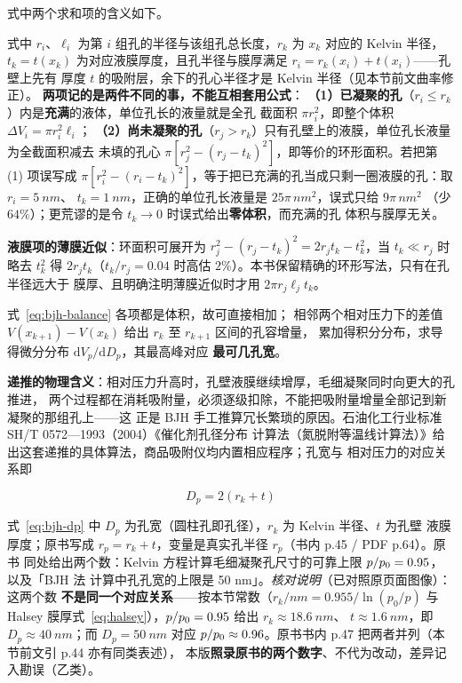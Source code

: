 式中两个求和项的含义如下。

式中 $r_i$、$\ell_i$ 为第 $i$ 组孔的半径与该组孔总长度，$r_k$ 为 $x_k$ 对应的 Kelvin
半径，$t_k=t(x_k)$ 为对应液膜厚度，且孔半径与膜厚满足 $r_i=r_k(x_i)+t(x_i)$——孔壁上先有
厚度 $t$ 的吸附层，余下的孔心半径才是 Kelvin 半径（见本节前文曲率修正）。
\textbf{两项记的是两件不同的事，不能互相套用公式}：
\textbf{（1）已凝聚的孔}（$r_i\le r_k$）内是\textbf{充满}的液体，单位孔长的液量就是全孔
截面积 $\pi r_i^{2}$，即整个体积 $\Delta V_i=\pi r_i^{2}\ell_i$；
\textbf{（2）尚未凝聚的孔}（$r_j>r_k$）只有孔壁上的液膜，单位孔长液量为全截面积减去
未填的孔心 $\pi[r_j^{2}-(r_j-t_k)^{2}]$，即等价的环形面积。若把第 (1) 项误写成
$\pi[r_i^{2}-(r_i-t_k)^{2}]$，等于把已充满的孔当成只剩一圈液膜的孔：取 $r_i=\qty{5}{nm}$、
$t_k=\qty{1}{nm}$，正确的单位孔长液量是 $25\pi\,\unit{nm^2}$，误式只给 $9\pi\,\unit{nm^2}$
（少 $64\%$）；更荒谬的是令 $t_k\to0$ 时误式给出\textbf{零体积}，而充满的孔
体积与膜厚无关。

\textbf{液膜项的薄膜近似}：环面积可展开为
$r_j^{2}-(r_j-t_k)^{2}=2r_jt_k-t_k^{2}$，当 $t_k\ll r_j$ 时略去 $t_k^{2}$ 得
$2r_jt_k$（$t_k/r_j=0.04$ 时高估 $2\%$）。本书保留精确的环形写法，只有在孔半径远大于
膜厚、且明确注明薄膜近似时才用 $2\pi r_j\ell_jt_k$。

式~\eqref{eq:bjh-balance} 各项都是体积，故可直接相加；
相邻两个相对压力下的差值 $V(x_{k+1})-V(x_k)$ 给出 $r_k$ 至 $r_{k+1}$ 区间的孔容增量，
累加得积分分布，求导得微分分布 $\mathrm{d}V_p/\mathrm{d}D_p$，其最高峰对应
\textbf{最可几孔宽}。

\textbf{递推的物理含义}：相对压力升高时，孔壁液膜继续增厚，毛细凝聚同时向更大的孔推进，
两个过程都在消耗吸附量，必须逐级扣除，不能把吸附量增量全部记到新凝聚的那组孔上——这
正是 BJH 手工推算冗长繁琐的原因。石油化工行业标准 SH/T 0572—1993（2004）《催化剂孔径分布
计算法（氮脱附等温线计算法）》给出这套递推的具体算法，商品吸附仪均内置相应程序；孔宽与
相对压力的对应关系即

\begin{equation}\label{eq:bjh-dp}
D_p=2\left(r_k+t\right)
\end{equation}

式~\eqref{eq:bjh-dp} 中 $D_p$ 为孔宽（圆柱孔即孔径），$r_k$ 为 Kelvin 半径、$t$ 为孔壁
液膜厚度；原书写成 $r_p=r_k+t$，变量是真实孔半径 $r_p$（书内 p.45 / PDF p.64）。原书
同处给出两个数：Kelvin 方程计算毛细凝聚孔尺寸的可靠上限 $p/p_{0}=0.95$，以及「BJH 法
计算中孔孔宽的上限是 50 nm」。\emph{核对说明}（已对照原页面图像）：这两个数
\textbf{不是同一个对应关系}——按本节常数（$r_k/\unit{nm}=0.955/\ln(p_0/p)$ 与 Halsey
膜厚式~\eqref{eq:halsey}），$p/p_{0}=0.95$ 给出 $r_k\approx\qty{18.6}{nm}$、
$t\approx\qty{1.6}{nm}$，即 $D_p\approx\qty{40}{nm}$；而 $D_p=\qty{50}{nm}$ 对应
$p/p_{0}\approx0.96$。原书书内 p.47 把两者并列（本节前文引 p.44 亦有同类表述），
本版\textbf{照录原书的两个数字}、不代为改动，差异记入勘误（乙类）。

